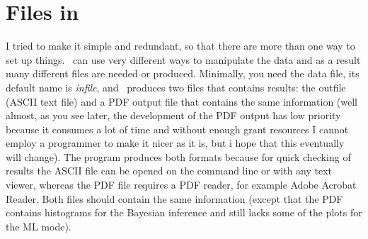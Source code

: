 \chapter{Files in \migrate}

I tried to make it simple and redundant, 
so that there are more than one way to set up things. \migrate\ can use very different ways to manipulate the data and as a result many different files are needed or produced. Minimally, you need the data file, its default name is {\sl infile}, and \migrate\ produces two files that contains results: the outfile (ASCII text file) and a PDF output file that contains the same information (well almost, as you see later, the development of the PDF output has low priority because it consumes a lot of time and without enough grant resources I cannot employ a programmer to make it nicer as it is, but i hope that this eventually will change). The program produces both formats because for quick checking of results the ASCII file can be opened on the command line or with any text viewer, whereas the PDF file requires a PDF reader, for example Adobe Acrobat Reader. Both files should contain the same information (except that the PDF contains histograms for the Bayesian inference and still lacks some of the plots for the ML mode).
\vskip 1cm
